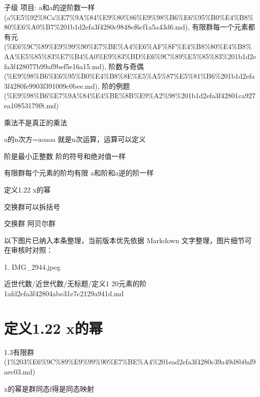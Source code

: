 \begin{definition}[定义1.20元素的阶]

子级 项目: a和a的逆阶数一样 (a\%E5\%92\%8Ca\%E7\%9A\%84\%E9\%80\%86\%E9\%98\%B6\%E6\%95\%B0\%E4\%B8\%80\%E6\%A0\%B7\%201b1d2efa3f4280c9848ef6cf1a5a43d6.md), 有限群每一个元素都有元 (\%E6\%9C\%89\%E9\%99\%90\%E7\%BE\%A4\%E6\%AF\%8F\%E4\%B8\%80\%E4\%B8\%AA\%E5\%85\%83\%E7\%B4\%A0\%E9\%83\%BD\%E6\%9C\%89\%E5\%85\%83\%201b1d2efa3f428077b99af9bef5e16a15.md), 阶数与奇偶 (\%E9\%98\%B6\%E6\%95\%B0\%E4\%B8\%8E\%E5\%A5\%87\%E5\%81\%B6\%201b1d2efa3f4280fe9903f391009c0bee.md), 阶的例题 (\%E9\%98\%B6\%E7\%9A\%84\%E4\%BE\%8B\%E9\%A2\%98\%201b1d2efa3f42801ca927ea10853179f8.md)

乘法不是真正的乘法

a的n次方=aoaoa 就是n次运算，运算可以定义

阶是最小正整数 阶的符号和绝对值一样

有限群每个元素的阶均有限 a和阶和a逆的阶一样

定义1.22 x的幂

交换群可以拆括号

交换群 阿贝尔群

\end{definition}

\begin{note}[关联图片]
以下图片已纳入本条整理，当前版本优先依据 Markdown 文字整理，图片细节可在审核时对照：

1. IMG\_2944.jpeg\\

\end{note}

\begin{note}[来源路径]

近世代数/近世代数/无标题/定义1 20元素的阶 1afd2efa3f42804abe31e7c2129a941d.md

\end{note}

\section*{定义1.22 x的幂}

\begin{note}[来源上级主题]

1.3有限群 (1\%203\%E6\%9C\%89\%E9\%99\%90\%E7\%BE\%A4\%201ead2efa3f4280c39a49d8b0af9aec03.md)

\end{note}

\begin{definition}[定义1.22 x的幂]

x的幂是群同态f得是同态映射

\end{definition}

